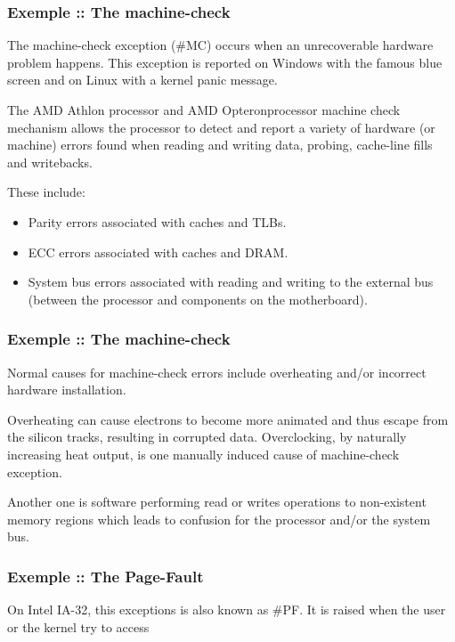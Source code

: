 \begin{frame}
  \frametitle{Exemple :: The machine-check}

The machine-check exception (\#MC) occurs when an unrecoverable hardware problem happens. This exception is reported on Windows with the famous blue screen and on Linux with a kernel panic message.

\-

The AMD Athlon processor and AMD Opteron\texttrademark processor machine check mechanism allows the processor to detect and report a variety of hardware (or machine) errors found when reading and writing data, probing, cache-line fills and writebacks.

\-

These include:

  \begin{itemize}
    \item
      Parity errors associated with caches and TLBs.
    \item
     ECC errors associated with caches and DRAM.
    \item
     System bus errors associated with reading and writing to the external bus (between the processor and components on the motherboard).
  \end{itemize}

\end{frame}


\begin{frame}
  \frametitle{Exemple :: The machine-check}


Normal causes for machine-check errors include overheating and/or incorrect hardware installation.

\-

Overheating can cause electrons to become more animated and thus escape from the silicon tracks, resulting in corrupted data. Overclocking, by naturally increasing heat output, is one manually induced cause of machine-check exception.

\-

Another one is software performing read or writes operations to non-existent memory regions which leads to confusion for the processor and/or the system bus. 

\end{frame}


\begin{frame}
  \frametitle{Exemple :: The Page-Fault}

On Intel IA-32, this exceptions is also known as \#PF. It is raised when the user or the kernel try to access 

\end{frame}


